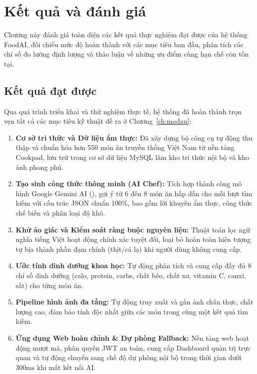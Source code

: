 \chapter{Kết quả và đánh giá}
\label{ch:ketqua}

\begin{muctieu}
Chương này đánh giá toàn diện các kết quả thực nghiệm đạt được của hệ thống FoodAI, đối chiếu mức độ hoàn thành với các mục tiêu ban đầu, phân tích các chỉ số đo lường định lượng và thảo luận về những ưu điểm cùng hạn chế còn tồn tại.
\end{muctieu}

\section{Kết quả đạt được}

Qua quá trình triển khai và thử nghiệm thực tế, hệ thống đã hoàn thành trọn vẹn tất cả các mục tiêu kỹ thuật đề ra ở Chương~\ref{ch:modau}:
\begin{enumerate}[leftmargin=1.6em, itemsep=2pt]
  \item \textbf{Cơ sở tri thức và Dữ liệu ẩm thực:} Đã xây dựng bộ công cụ tự động thu thập và chuẩn hóa hơn 550 món ăn truyền thống Việt Nam từ nền tảng Cookpad, lưu trữ trong cơ sở dữ liệu MySQL làm kho tri thức nội bộ và kho ảnh phong phú.
  \item \textbf{Tạo sinh công thức thông minh (AI Chef):} Tích hợp thành công mô hình Google Gemini AI (), gợi ý từ 6 đến 8 món ăn hấp dẫn cho mỗi lượt tìm kiếm với cấu trúc JSON chuẩn 100\%, bao gồm lời khuyên ẩm thực, công thức chế biến và phân loại độ khó.
  \item \textbf{Khử ảo giác và Kiểm soát ràng buộc nguyên liệu:} Thuật toán lọc ngữ nghĩa tiếng Việt hoạt động chính xác tuyệt đối, loại bỏ hoàn toàn hiện tượng tự bịa thành phần đạm chính (thịt/cá lạ) khi người dùng không cung cấp.
  \item \textbf{Ước tính dinh dưỡng khoa học:} Tự động phân tích và cung cấp đầy đủ 8 chỉ số dinh dưỡng (calo, protein, carbs, chất béo, chất xơ, vitamin C, canxi, sắt) cho từng món ăn.
  \item \textbf{Pipeline hình ảnh đa tầng:} Tự động truy xuất và gắn ảnh chân thực, chất lượng cao, đảm bảo tính độc nhất giữa các món trong cùng một kết quả tìm kiếm.
  \item \textbf{Ứng dụng Web hoàn chỉnh \& Dự phòng Fallback:} Nền tảng web hoạt động mượt mà, phân quyền JWT an toàn, cung cấp Dashboard quản trị trực quan và tự động chuyển sang chế độ dự phòng nội bộ trong thời gian dưới 300ms khi mất kết nối AI.
\end{enumerate}

